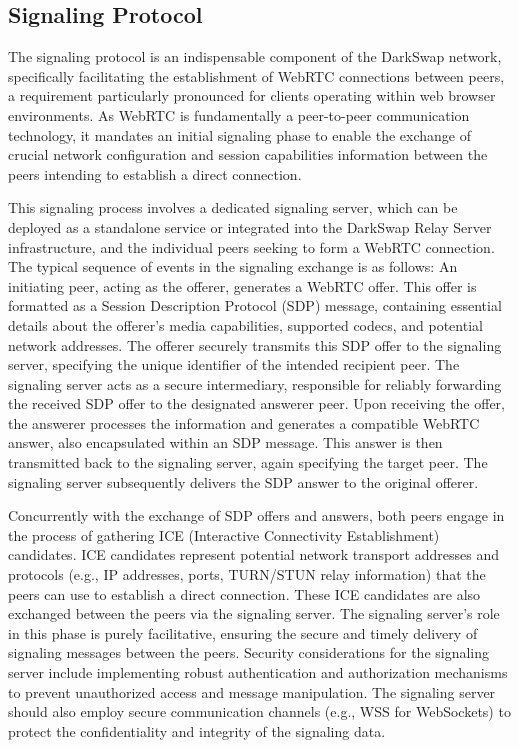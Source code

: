 \documentclass{article}
\begin{document}
\subsection{Signaling Protocol}
The signaling protocol is an indispensable component of the DarkSwap network, specifically facilitating the establishment of WebRTC connections between peers, a requirement particularly pronounced for clients operating within web browser environments. As WebRTC is fundamentally a peer-to-peer communication technology, it mandates an initial signaling phase to enable the exchange of crucial network configuration and session capabilities information between the peers intending to establish a direct connection.

This signaling process involves a dedicated signaling server, which can be deployed as a standalone service or integrated into the DarkSwap Relay Server infrastructure, and the individual peers seeking to form a WebRTC connection. The typical sequence of events in the signaling exchange is as follows: An initiating peer, acting as the offerer, generates a WebRTC offer. This offer is formatted as a Session Description Protocol (SDP) message, containing essential details about the offerer's media capabilities, supported codecs, and potential network addresses. The offerer securely transmits this SDP offer to the signaling server, specifying the unique identifier of the intended recipient peer. The signaling server acts as a secure intermediary, responsible for reliably forwarding the received SDP offer to the designated answerer peer. Upon receiving the offer, the answerer processes the information and generates a compatible WebRTC answer, also encapsulated within an SDP message. This answer is then transmitted back to the signaling server, again specifying the target peer. The signaling server subsequently delivers the SDP answer to the original offerer.

Concurrently with the exchange of SDP offers and answers, both peers engage in the process of gathering ICE (Interactive Connectivity Establishment) candidates. ICE candidates represent potential network transport addresses and protocols (e.g., IP addresses, ports, TURN/STUN relay information) that the peers can use to establish a direct connection. These ICE candidates are also exchanged between the peers via the signaling server. The signaling server's role in this phase is purely facilitative, ensuring the secure and timely delivery of signaling messages between the peers. Security considerations for the signaling server include implementing robust authentication and authorization mechanisms to prevent unauthorized access and message manipulation. The signaling server should also employ secure communication channels (e.g., WSS for WebSockets) to protect the confidentiality and integrity of the signaling data.
\end{document}
